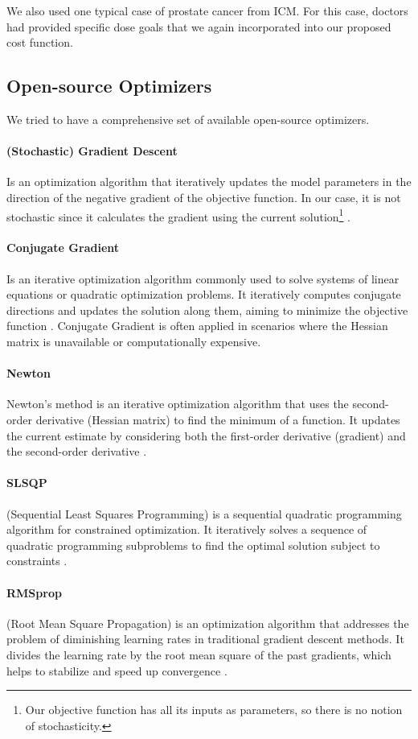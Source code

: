 We also used one typical case of prostate cancer from ICM.
For this case, doctors had provided specific dose goals that we again incorporated into our proposed cost function.

\subsection{Open-source Optimizers}
We tried to have a comprehensive set of available open-source optimizers.
\paragraph{(Stochastic) Gradient Descent}
Is an optimization algorithm that iteratively updates the model parameters in the direction of the negative gradient of the objective function.
In our case, it is not stochastic since it calculates the gradient using the current solution\footnote{Our objective function has all its inputs as parameters, so there is no notion of stochasticity.} \cite{Lemarechal2012}.
\paragraph{Conjugate Gradient}
Is an iterative optimization algorithm commonly used to solve systems of linear equations or quadratic optimization problems.
It iteratively computes conjugate directions and updates the solution along them, aiming to minimize the objective function \cite{Hestenes1952}.
Conjugate Gradient is often applied in scenarios where the Hessian matrix is unavailable or computationally expensive.
\paragraph{Newton}
Newton's method is an iterative optimization algorithm that uses the second-order derivative (Hessian matrix) to find the minimum of a function.
It updates the current estimate by considering both the first-order derivative (gradient) and the second-order derivative \cite{Nocedal06}.
\paragraph{SLSQP}
(Sequential Least Squares Programming) is a sequential quadratic programming algorithm for constrained optimization.
It iteratively solves a sequence of quadratic programming subproblems to find the optimal solution subject to constraints \cite{Bonnans2006}.
\paragraph{RMSprop}
(Root Mean Square Propagation) is an optimization algorithm that addresses the problem of diminishing learning rates in traditional gradient descent methods.
It divides the learning rate by the root mean square of the past gradients, which helps to stabilize and speed up convergence \cite{Hinton2012}.
